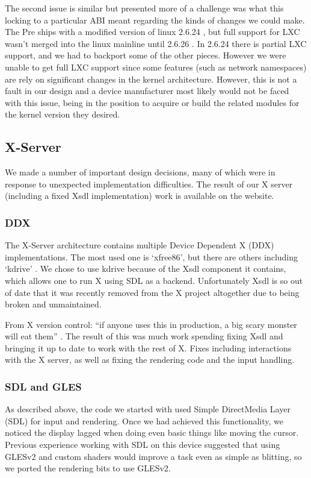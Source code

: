     The second issue is similar but presented more of a challenge was what this locking to a particular ABI meant regarding the kinds of changes we could make.  The Pre ships with a modified version of linux 2.6.24 , but full support for LXC wasn't merged into the linux mainline until 2.6.26 .  In 2.6.24 there is partial LXC support, and we had to backport some of the other pieces.  However we were unable to get full LXC support since some features (such as network namespaces) are rely on significant changes in the kernel architecture.  However, this is not a fault in our design and a device manufacturer most likely would not be faced with this issue, being in the position to acquire or build the related modules for the kernel version they desired.



\subsection{X-Server}

We made a number of important design decisions, many of which were in response to unexpected implementation difficulties.  The result of our X server (including a fixed Xsdl implementation) work is available on the website\footnotemark[1].
\subsubsection{DDX}
The X-Server architecture contains multiple Device Dependent X (DDX) implementations.  The most used one is `xfree86', but there are others including `kdrive' \cite{x_glossary}.  We chose to use kdrive because of the Xsdl component it contains, which allows one to run X using SDL as a backend.  Unfortunately Xsdl is so out of date that it was recently removed from the X project altogether due to being broken and unmaintained.

From X version control: ``if anyone uses this in production, a big scary monster will eat them'' \cite{x_quote}.  The result of this was much work spending fixing Xsdl and bringing it up to date to work with the rest of X.  Fixes including interactions with the X server, as well as fixing the rendering code and the input handling.
\subsubsection{SDL and GLES}
As described above, the code we started with used Simple DirectMedia Layer (SDL) \cite{sdl} for input and rendering.  Once we had achieved this functionality, we noticed the display lagged when doing even basic things like moving the cursor.  Previous experience working with SDL on this device suggested that using GLESv2 \cite{gles} and custom shaders would improve a task even as simple as blitting, so we ported the rendering bits to use GLESv2.

